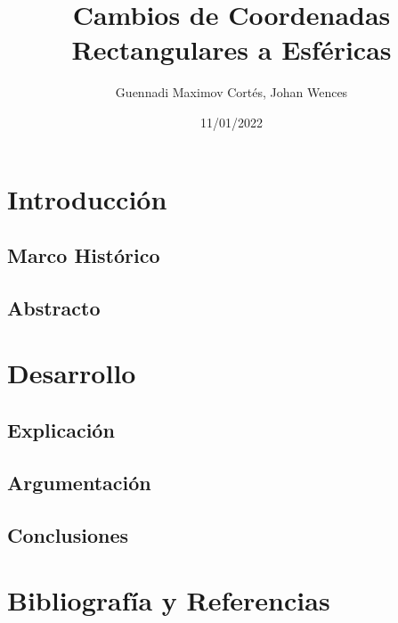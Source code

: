 \documentclass[letterpaper,14pt]{extreport} %
\title{Cambios de Coordenadas Rectangulares a Esféricas} %
\author{Guennadi Maximov Cortés, Johan Wences} %
\date{11/01/2022} %
\begin{document}
  \maketitle
  \tableofcontents
  \newpage

  \section{Introducción}
    \subsection{Marco Histórico}
    \subsection{Abstracto}
  \section{Desarrollo}
    \subsection{Explicación}
    \subsection{Argumentación}
    \subsection{Conclusiones}
  \section{Bibliografía y Referencias}
\end{document}
